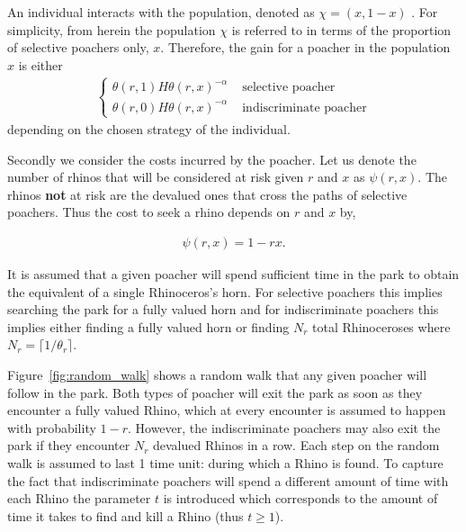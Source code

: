 \documentclass[10pt]{article}
\begin{document}
An individual interacts with the population, denoted as \(\chi=(x,1-x)\) .
For simplicity, from herein the population \(\chi\) is referred to in terms
of the proportion of selective poachers only, \(x\).
Therefore, the gain for a poacher in the population \(x\) is either
\begin{eqnarray}
    \label{eqn:gain}
    \left\{
    \begin{array}{cl}
    \theta(r, 1) H \theta(r, x)^{-\alpha} & \mbox{ selective poacher}
    \\
    \theta(r, 0) H \theta(r, x)^{-\alpha} & \mbox{ indiscriminate poacher}
    \end{array} \right.
\end{eqnarray}
depending on the chosen strategy of the individual.

Secondly we consider the costs incurred by the poacher. Let us denote the number
of rhinos that will be considered at risk given \(r\) and \(x\) as \(\psi(r, x)\).
The rhinos \textbf{not} at risk are the devalued ones
that cross the paths of selective poachers. Thus the cost to seek a rhino depends
on \(r\) and \(x\) by,

\begin{eqnarray}
    \label{eqn:psi}
    \psi(r, x) = 1 - rx.
\end{eqnarray}


It is assumed that a given poacher will spend sufficient time in the park to
obtain the equivalent of a single Rhinoceros's horn. For selective poachers this
implies searching the park for a fully valued horn and for indiscriminate
poachers this implies either finding a fully valued horn or finding \(N_r\)
total Rhinoceroses where \(N_r = \lceil 1 / \theta_r \rceil\).

Figure~\ref{fig:random_walk} shows a random walk that any given poacher will
follow in the park. Both types of poacher will exit the park as soon as they
encounter a fully valued Rhino, which at every encounter is assumed to happen
with probability \(1 - r\). However, the indiscriminate poachers may also exit
the park if they encounter \(N_r\) devalued Rhinos in a row.
Each step on the random walk is assumed to last 1 time unit: during which a
Rhino is found.
To capture the fact that indiscriminate poachers will spend a different amount
of time with each Rhino the parameter \(t\) is introduced which corresponds to
the amount of time it takes to find and kill a Rhino (thus \(t\geq 1\)).
\end{document}
